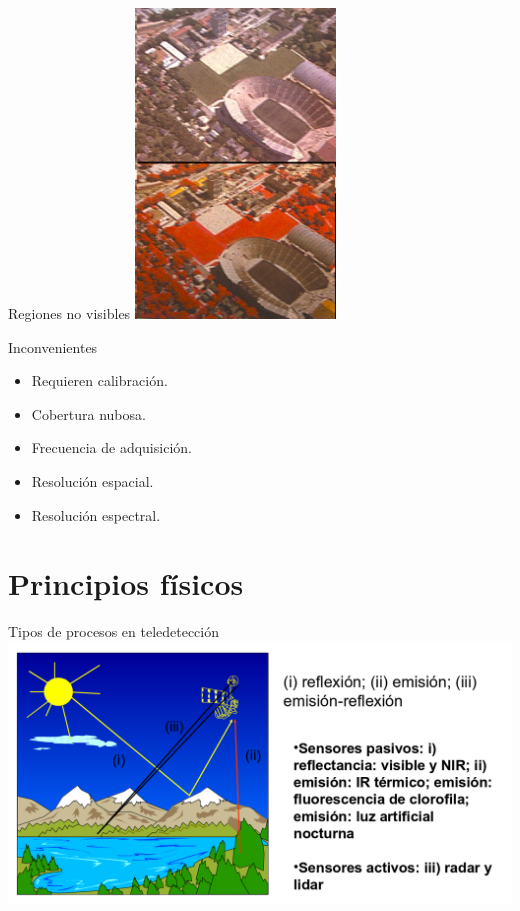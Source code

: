 \documentclass{beamer}
\begin{document}
\begin{frame}{Regiones no visibles}
	\centering
	\includegraphics[width=0.4\textwidth]{IMGs/VISNIR}
\end{frame}

\begin{frame}{Inconvenientes}
	\begin{itemize}
		\item Requieren calibración.
		\item Cobertura nubosa.
		\item Frecuencia de adquisición.
		\item Resolución espacial.
		\item Resolución espectral.
	\end{itemize}
\end{frame}

\section{Principios físicos}

\begin{frame}{Tipos de procesos en teledetección}
	\includegraphics[width=\textwidth]{IMGs/procesos}
\end{frame}
\end{document}

